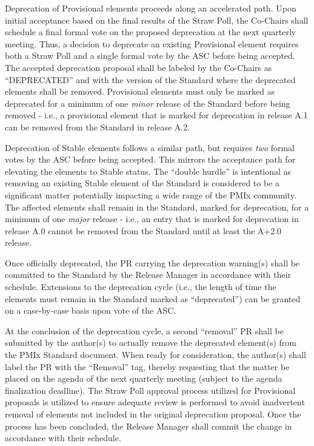 \documentclass{article}
\begin{document}
Deprecation of Provisional elements proceeds along an accelerated
path. Upon initial acceptance based on the final results of the
Straw Poll, the Co-Chairs shall schedule a final formal
vote on the proposed deprecation at the next quarterly meeting. Thus, a
decision to deprecate an existing Provisional element requires both
a Straw Poll and a single formal vote by the ASC before being accepted.
The accepted deprecation proposal shall be labeled by the Co-Chairs as
``DEPRECATED'' and with the version of the Standard where the
deprecated elements shall be removed. Provisional elements must only
be marked as deprecated for a minimum of one \emph{minor} release of the
Standard before being removed - i.e., a provisional element that is
marked for deprecation in release A.1 can be removed from the Standard
in release A.2.

Deprecation of Stable elements follows a similar path, but requires
\emph{two} formal votes by the ASC before being accepted. This mirrors
the acceptance path for elevating the elements to Stable status. The
``double hurdle'' is intentional as removing an existing Stable
element of the Standard is considered to be a significant matter
potentially impacting a wide range of the PMIx community. The affected
elements shall remain in the Standard, marked for deprecation, for a
minimum of one \emph{major} release - i.e., an entry that is marked for
deprecation in release A.0 cannot be removed from the Standard until at
least the A+2.0 release.

Once officially deprecated, the PR carrying the deprecation warning(s)
shall be committed to the Standard by the Release Manager in accordance
with their schedule. Extensions to the deprecation cycle (i.e., the
length of time the elements must remain in the Standard marked as
``deprecated'') can be granted on a case-by-case basis upon vote of the
ASC.

At the conclusion of the deprecation cycle, a second ``removal'' PR
shall be submitted by the author(s) to actually remove the deprecated
element(s) from the PMIx Standard document. When ready for
consideration, the author(s) shall label the PR with the ``Removal''
tag, thereby requesting that the matter be placed on the agenda of the
next quarterly meeting (subject to the agenda finalization deadline). The Straw
Poll approval process utilized for Provisional proposals is
utilized to ensure adequate review is performed to avoid inadvertent
removal of elements not included in the original deprecation proposal.
Once the process has been concluded, the Release Manager shall commit
the change in accordance with their schedule.
\end{document}
